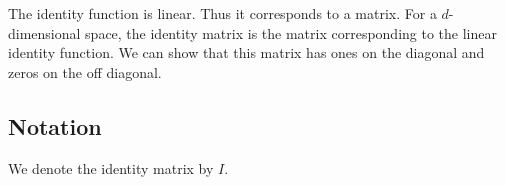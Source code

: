 
\sbasic


















\sstart
{}



The identity function is linear.
Thus it corresponds to a
matrix. For a $d$-dimensional
space, the identity matrix
is the matrix corresponding
to the linear identity function.
We can show that this matrix
has ones on the diagonal and
zeros on the off diagonal.

\subsection{Notation}

We denote the identity
matrix by $I$.

\strats

